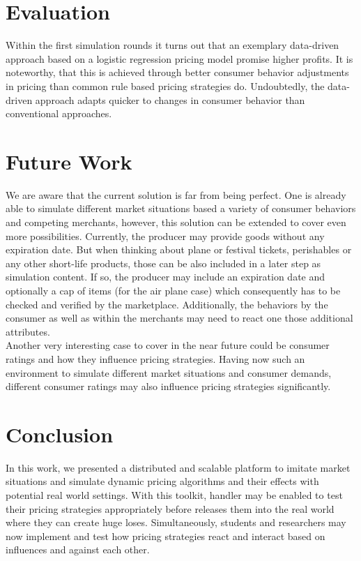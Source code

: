 %
\section{Evaluation}
\label{sec:evaluation}
%
Within the first simulation rounds it turns out that an exemplary data-driven approach based on a logistic regression \citep{hosmer2013applied} pricing model promise higher profits. It is noteworthy, that this is achieved through better consumer behavior adjustments in pricing than common rule based pricing strategies do.  
Undoubtedly, the data-driven approach adapts quicker to changes in consumer behavior than conventional approaches.


\section{Future Work}
\label{sec:Future_Work}
%
We are aware that the current solution is far from being perfect. One is already able to simulate different market situations based a variety of consumer behaviors and competing merchants, however, this solution can be extended to cover even more possibilities. Currently, the producer may provide goods without any expiration date. But when thinking about plane or festival tickets, perishables or any other short-life products, those can be also included in a later step as simulation content. If so, the producer may include an expiration date and optionally a cap of items (for the air plane case) which consequently has to be checked and verified by the marketplace. Additionally, the behaviors by the consumer as well as within the merchants may need to react one those additional attributes.\\

Another very interesting case to cover in the near future could be consumer ratings and how they influence pricing strategies. Having now such an environment to simulate different market situations and consumer demands, different consumer ratings may also influence pricing strategies significantly.

\section{Conclusion}
\label{sec:conclusion}
%
In this work, we presented a distributed and scalable platform to imitate market situations and simulate dynamic pricing algorithms and their effects with potential real world settings. With this toolkit, handler may be enabled to test their pricing strategies appropriately before releases them into the real world where they can create huge loses. Simultaneously, students and researchers may now implement and test how pricing strategies react and interact based on influences and against each other.\\

